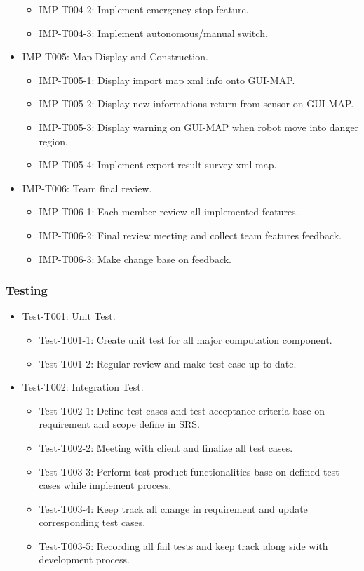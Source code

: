 \begin{itemize}
\begin{itemize}
				\item IMP-T004-2: Implement emergency stop feature.
				\item IMP-T004-3: Implement autonomous/manual switch.
		\end{itemize}
		\item IMP-T005: Map Display and Construction.
		\begin{itemize}
			\item IMP-T005-1: Display import map xml info onto GUI-MAP.
			\item IMP-T005-2: Display new informations return from sensor on GUI-MAP.
			\item IMP-T005-3: Display warning on GUI-MAP when robot move into danger region.
			\item IMP-T005-4: Implement export result survey xml map.
		\end{itemize}
		\item IMP-T006: Team final review.
		\begin{itemize}
			\item IMP-T006-1: Each member review all implemented features.
			\item IMP-T006-2: Final review meeting and collect team features feedback.
			\item IMP-T006-3: Make change base on feedback.
		\end{itemize}
	\end{itemize}

	\subsubsection{Testing}
	\begin{itemize}
		\item Test-T001: Unit Test.
		\begin{itemize}
				\item Test-T001-1: Create unit test for all major computation component.
				\item Test-T001-2: Regular review and make test case up to date.
		\end{itemize}
		\item Test-T002: Integration Test.
		\begin{itemize}
				\item Test-T002-1: Define test cases and test-acceptance criteria base on requirement and scope define in SRS.
				\item Test-T002-2: Meeting with client and finalize all test cases.
				\item Test-T003-3: Perform test product functionalities base on defined test cases while implement process.
				\item Test-T003-4: Keep track all change in requirement and update corresponding test cases.
				\item Test-T003-5: Recording all fail tests and keep track along side with development process.
		\end{itemize}
	\end{itemize}

